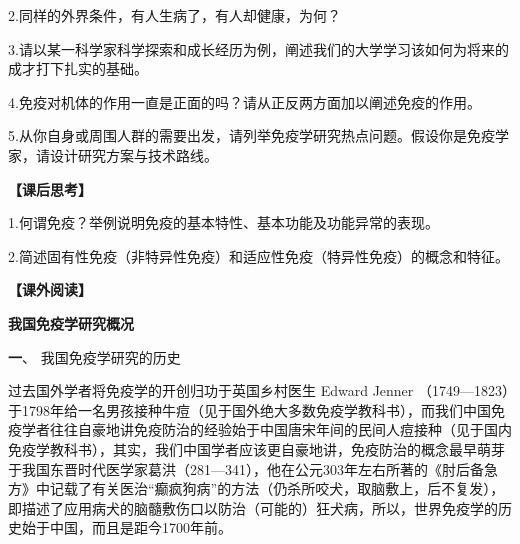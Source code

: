 2.同样的外界条件，有人生病了，有人却健康，为何？

3.请以某一科学家科学探索和成长经历为例，阐述我们的大学学习该如何为将来的成才打下扎实的基础。

4.免疫对机体的作用一直是正面的吗？请从正反两方面加以阐述免疫的作用。

5.从你自身或周围人群的需要出发，请列举免疫学研究热点问题。假设你是免疫学家，请设计研究方案与技术路线。

\noindent\textbf{【课后思考】}

1.何谓免疫？举例说明免疫的基本特性、基本功能及功能异常的表现。

2.简述固有性免疫（非特异性免疫）和适应性免疫（特异性免疫）的概念和特征。

\noindent\textbf{【课外阅读】}
\begin{center}
\textbf{\Large 我国免疫学研究概况}
\end{center}
\begin{center}
{\large\textbf 一、 我国免疫学研究的历史}
\end{center}

过去国外学者将免疫学的开创归功于英国乡村医生 Edward Jenner
（1749---1823）于1798年给一名男孩接种牛痘（见于国外绝大多数免疫学教科书），而我们中国免疫学者往往自豪地讲免疫防治的经验始于中国唐宋年间的民间人痘接种（见于国内免疫学教科书），其实，我们中国学者应该更自豪地讲，免疫防治的概念最早萌芽于我国东晋时代医学家葛洪（281---341），他在公元303年左右所著的《肘后备急方》中记载了有关医治“癫疯狗病”的方法（仍杀所咬犬，取脑敷上，后不复发），即描述了应用病犬的脑髓敷伤口以防治（可能的）狂犬病，所以，世界免疫学的历史始于中国，而且是距今1700年前。

